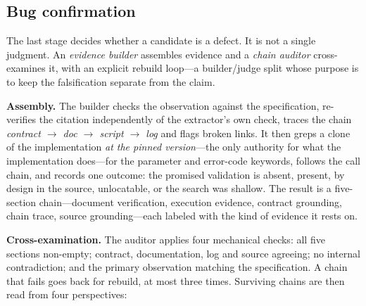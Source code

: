 \documentclass[acmsmall,screen,review,anonymous]{acmart}
\begin{document}
\subsection{Bug confirmation}
\label{subsec:confirmation}

The last stage decides whether a candidate is a defect. It is not a single judgment. An
\emph{evidence builder} assembles evidence and a \emph{chain auditor} cross-examines it, with an
explicit rebuild loop---a builder/judge split whose purpose is to keep the falsification separate
from the claim.

\textbf{Assembly.} The builder checks the observation against the specification, re-verifies the
citation independently of the extractor's own check, traces the chain \emph{contract $\rightarrow$
doc $\rightarrow$ script $\rightarrow$ log} and flags broken links. It then greps a clone of the
implementation \emph{at the pinned version}---the only authority for what the implementation
does---for the parameter and error-code keywords, follows the call chain, and records one outcome:
the promised validation is absent, present, by design in the source, unlocatable, or the search was
shallow. The result is a five-section chain---document verification, execution evidence, contract
grounding, chain trace, source grounding---each labeled with the kind of evidence it rests on.

\textbf{Cross-examination.} The auditor applies four mechanical checks: all five sections non-empty;
contract, documentation, log and source agreeing; no internal contradiction; and the primary
observation matching the specification. A chain that fails goes back for rebuild, at most three
times. Surviving chains are then read from four
perspectives:
\end{document}
